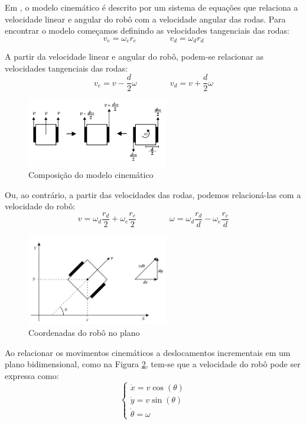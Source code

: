 Em \cite{vieira2005controle}, o modelo cinemático é descrito  
por um sistema de equações que relaciona a velocidade  
linear e angular do robô com a velocidade angular das rodas.  
Para encontrar o modelo começamos definindo as velocidades tangenciais das rodas:
\begin{equation}
v_e = \omega_e r_e
\qquad  
\qquad
v_d = \omega_d r_d
\end{equation}

A partir da velocidade linear e angular do robô,  
podem-se relacionar as velocidades tangenciais das rodas:
\begin{equation}
v_e = v - \frac{d}{2} \omega
\qquad  
\qquad
v_d = v + \frac{d}{2} \omega
\label{eq:velocities}
\end{equation}
\begin{figure}[h]
    \centering
    \includegraphics[width=0.55\textwidth]{figures/robot_composition.png}
    \caption{Composição do modelo cinemático}
    \label{fig:robot_composition}
\end{figure}

Ou, ao contrário, a partir das velocidades das rodas, podemos relacioná-las com a velocidade do robô:
\begin{equation}
v = \omega_d \frac{r_d}{2} + \omega_e \frac{r_e}{2} 
\qquad
\qquad
\omega = \omega_d \frac{r_d}{d} - \omega_e \frac{r_e}{d}
\label{eq:cinematic_model}
\end{equation}
\begin{figure}[h]
    \centering
    \includegraphics[width=0.55\textwidth]{figures/robot_coordinates.png}
    \caption{Coordenadas do robô no plano}
    \label{fig:robot_coordinates}
\end{figure}

Ao relacionar os movimentos cinemáticos a deslocamentos incrementais  
em um plano bidimensional, como na Figura \ref{fig:robot_coordinates},  
tem-se que a velocidade do robô pode ser expressa como:
\begin{equation}
\begin{cases}
\dot{x} = v \cos(\theta) \\
\dot{y} = v \sin(\theta) \\
\dot{\theta} = \omega
\end{cases}
\label{eq:cinematic_velocity}
\end{equation}